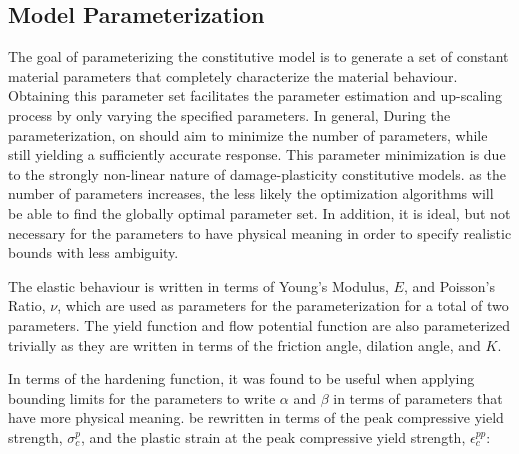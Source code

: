 \subsection{Model Parameterization}

The goal of parameterizing the constitutive model is to generate a set of constant material parameters that completely characterize the material behaviour. Obtaining this parameter set facilitates the parameter estimation and up-scaling process by only varying the specified parameters. In general, During the parameterization, on should aim to minimize the number of parameters, while still yielding a sufficiently accurate response. This parameter minimization is due to the strongly non-linear nature of damage-plasticity constitutive models. as the number of parameters increases, the less likely the optimization algorithms will be able to find the globally optimal parameter set. In addition, it is ideal, but not necessary for the parameters to have physical meaning in order to specify realistic bounds with less ambiguity.

The elastic behaviour is written in terms of Young's Modulus, $E$, and Poisson's Ratio, $\nu$, which are used as parameters for the parameterization for a total of two parameters. The yield function and flow potential function are also parameterized trivially as they are written in terms of the friction angle, dilation angle, and $K$.

In terms of the hardening function, it was found to be useful when applying bounding limits for the parameters to write $\alpha$ and $\beta$ in terms of parameters that have more physical meaning.  be rewritten in terms of the peak compressive yield strength, $\sigma_{c}^{p}$, and the plastic strain at the peak compressive yield strength, $\epsilon_c^{pp}$:
